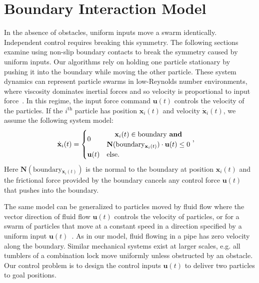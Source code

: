 \section{Boundary Interaction Model}
\label{sec:theory}
 In the absence of obstacles, uniform inputs move a swarm identically.  
 Independent control requires breaking this symmetry. 
The following sections examine using non-slip boundary contacts to break the symmetry caused by uniform inputs.  
 Our algorithms rely on holding one particle stationary by pushing it into the boundary while moving the other particle. 
 These system dynamics can represent particle swarms in low-Reynolds number environments, where viscosity dominates inertial forces and so velocity is proportional to input force~\cite{Purcell1977}. 
 In this regime, the input force command $\mathbf{u}(t)$ controls the velocity of the particles.  
 If the $i^{\textrm{th}}$ particle has position $\mathbf{x}_i(t)$ and velocity $\dot{\mathbf{x}}_i(t)$,  we assume the following system model:
  \begin{align}\label{eq:swarmDynamicsAndFric} 
\dot{\mathbf{x}}_i(t)
 &= \begin{cases}
  0 &\begin{matrix} \mathbf{x}_i(t) \in  \textrm{boundary \textbf{and}}\\
\mathbf{N}(\textrm{boundary$_{\mathbf{x}_i(t)}$})\cdot   \mathbf{u}(t) \le 0 \end{matrix}
\textrm{    ,} \\
 \mathbf{u}(t) & \textrm{else}.
 \end{cases}
 \end{align}
 Here
 $\mathbf{N}(\textrm{boundary$_{\mathbf{x}_i(t)}$})$ is the normal to the boundary at position $\mathbf{x}_i(t)$ and the frictional force provided by the boundary cancels any control force $ \mathbf{u}(t)$ that pushes into the boundary.
 
  The same model can be generalized to particles moved by fluid flow where the vector direction of fluid flow $\mathbf{u}(t)$ controls the velocity of particles, or for a swarm of particles that move at a constant speed in a direction specified by a uniform input $\mathbf{u}(t)$~\cite{Rubenstein2012}.
  As in our model, fluid flowing in a pipe has zero velocity along the boundary. Similar mechanical systems exist at larger scales, e.g. all tumblers of a combination lock move uniformly unless obstructed by an obstacle.
 Our control problem is to design the control inputs $\mathbf{u}(t)$ to deliver two particles to goal positions.
 
